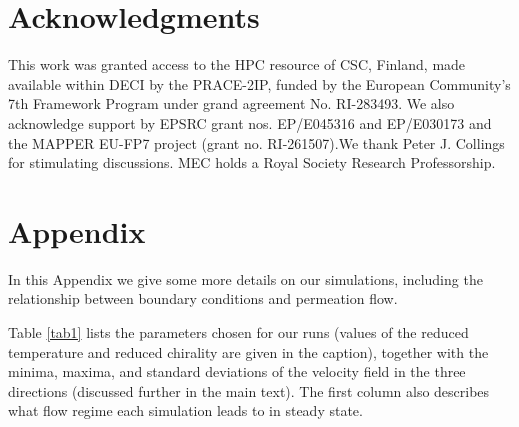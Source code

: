 \documentclass[8.5pt,twoside,twocolumn]{article}
\begin{document}
{%

\section*{Acknowledgments}

This work was granted access to the HPC resource of CSC, Finland, made available 
within DECI by the PRACE-2IP, funded by the European Community's 7th Framework 
Program under grand agreement No. RI-283493. We also acknowledge support by 
EPSRC grant nos. EP/E045316 and EP/E030173 and the MAPPER EU-FP7 project 
(grant no. RI-261507).We thank Peter J. Collings for stimulating discussions. 
MEC holds a Royal Society Research Professorship.

\appendix
\section*{Appendix}

In this Appendix we give some more details on our simulations,
including the relationship between boundary conditions and
permeation flow.

Table \ref{tab1} lists the parameters chosen for our runs (values of
the reduced temperature and reduced chirality are given in the caption),
together with the minima, maxima, and standard deviations of the velocity
field in the three directions (discussed further in the main text). 
The first column also describes what flow regime each simulation
leads to in steady state.

}
\end{document}
